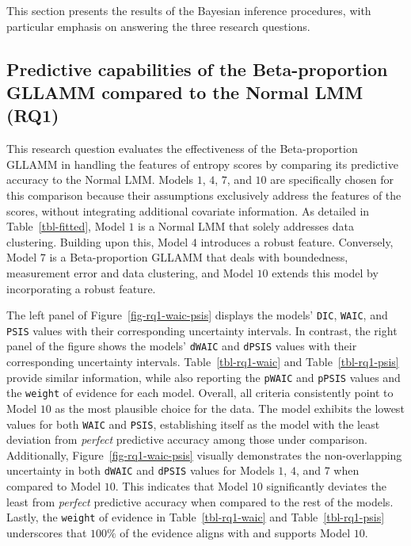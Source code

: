 \documentclass[
  authoryear,
  preprint,
  1p]{elsarticle}
\begin{document}
This section presents the results of the Bayesian inference procedures,
with particular emphasis on answering the three research questions.

\subsection{Predictive capabilities of the Beta-proportion GLLAMM
compared to the Normal LMM (RQ1)}\label{sec-R-RQ1}

This research question evaluates the effectiveness of the
Beta-proportion GLLAMM in handling the features of entropy scores by
comparing its predictive accuracy to the Normal LMM. Models \(1\),
\(4\), \(7\), and \(10\) are specifically chosen for this comparison
because their assumptions exclusively address the features of the
scores, without integrating additional covariate information. As
detailed in Table~\ref{tbl-fitted}, Model \(1\) is a Normal LMM that
solely addresses data clustering. Building upon this, Model \(4\)
introduces a robust feature. Conversely, Model \(7\) is a
Beta-proportion GLLAMM that deals with boundedness, measurement error
and data clustering, and Model \(10\) extends this model by
incorporating a robust feature.

{The left panel of Figure~\ref{fig-rq1-waic-psis} displays the models'
\texttt{DIC}, \texttt{WAIC}, and \texttt{PSIS} values with their
corresponding uncertainty intervals. In contrast, the right panel of the
figure shows the models' \texttt{dWAIC} and \texttt{dPSIS} values with
their corresponding uncertainty intervals. Table~\ref{tbl-rq1-waic} and
Table~\ref{tbl-rq1-psis} provide similar information, while also
reporting the \texttt{pWAIC} and \texttt{pPSIS} values and the
\texttt{weight} of evidence for each model.} Overall, all criteria
consistently point to Model \(10\) as the most plausible choice for the
data. The model exhibits the lowest values for both \texttt{WAIC} and
\texttt{PSIS}, establishing itself as the model with the least deviation
from \emph{perfect} predictive accuracy among those under comparison.
{Additionally, Figure~\ref{fig-rq1-waic-psis} visually demonstrates the
non-overlapping uncertainty in both \texttt{dWAIC} and \texttt{dPSIS}
values for Models \(1\), \(4\), and \(7\) when compared to Model
\(10\).} This indicates that Model \(10\) significantly deviates the
least from \emph{perfect} predictive accuracy when compared to the rest
of the models. Lastly, the \texttt{weight} of evidence in
Table~\ref{tbl-rq1-waic} and Table~\ref{tbl-rq1-psis} underscores that
\(100\%\) of the evidence aligns with and supports Model \(10\).
\end{document}
